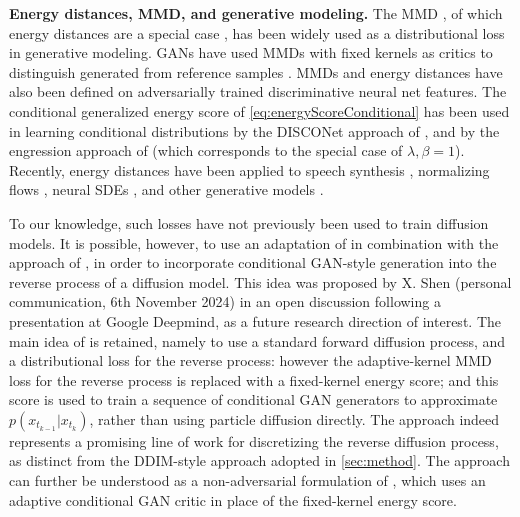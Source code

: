 \textbf{Energy distances, MMD, and generative modeling.}
The MMD \citep{gretton2012kernel}, of which energy distances \citep{szekely2013energy,rizzo2016energy} are a special case \citep{sejdinovic2013equivalence}, has been widely used as a distributional loss in generative modeling. GANs have used MMDs with fixed kernels as critics to distinguish generated from reference samples \citep{li2015generative,dziugaite2015training,Unterthiner2018coulomb}. MMDs \citep{li2017mmdGan,binkowski2018demystifying} and energy distances \citep{energy-distance-gan,bellemare2017cramerdistancesolutionbiased,salimans2018improvinggansusingoptimal} have also been defined on adversarially trained discriminative neural net features.
The conditional generalized energy score of \eqref{eq:energyScoreConditional} has been used in learning conditional distributions by the DISCONet approach of \citet{bouchacourt2016disco},  and by the engression approach of \citet{shen2024engression} 
(which corresponds to the special case of $\lambda,\beta=1$). Recently, energy distances have been applied to speech synthesis \cite{gritsenko2020spectral}, normalizing flows \cite{si2023semi}, neural SDEs \cite{issa2024non}, and other generative models \citep{chen2024generative,Pacchiardi2024}.

To our knowledge, such losses have not previously been used to train diffusion models.
It is possible, however, to use an adaptation of  \citep{galashov2024deep}  in combination with the approach of \citet{bouchacourt2016disco,shen2024engression}, in order to incorporate conditional GAN-style generation into the reverse process of a diffusion model.  This idea was proposed by X. Shen  (personal communication, 6th November 2024) in an open  discussion following a presentation at Google Deepmind, as a future research direction of interest. The main idea of \citet{galashov2024deep} is retained, namely to use a standard forward diffusion  process, and a distributional loss for the reverse process: however the adaptive-kernel MMD loss for the reverse process is replaced with a fixed-kernel energy score; and this score is used to train a sequence of conditional GAN generators to approximate $p(x_{t_{k-1}} |x_{t_{k}})$, rather than using particle diffusion directly. The approach indeed represents a promising line of work \citep[since developed in][]{shen2025reversemarkovlearningmultistep} for discretizing the reverse diffusion process, as distinct from the DDIM-style approach adopted in  \cref{sec:method}. The approach can further be understood as a non-adversarial formulation of  \citet{cheng2024conditionalganenhancingdiffusion}, which uses an adaptive conditional GAN critic in place of the fixed-kernel energy score.

